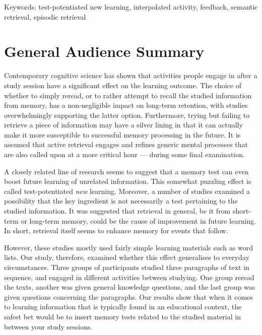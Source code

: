 \documentclass[12pt]{article}
\begin{document}
\bigskip

\noindent Keywords: test-potentiated new learning, interpolated activity, 
feedback, semantic retrieval, episodic retrieval

\clearpage

\section{General Audience Summary}

%
%

Contemporary cognitive science has shown that activities people engage in 
after a study session have a significant effect on the learning outcome. The 
choice of whether to simply reread, or to rather attempt to recall the 
studied information from memory, has a non-negligible impact on long-term 
retention, with studies overwhelmingly supporting the latter option. 
Furthermore, trying but failing to retrieve a piece of information may have 
a silver lining in that it can actually make it more susceptible to 
successful memory processing in the future. It is assumed that active 
retrieval engages and refines generic mental processes that are also called 
upon at a more critical hour --- during some final examination. 

A closely related line of research seems to suggest that a memory test can 
even boost future learning of unrelated information. This somewhat puzzling 
effect is called test-potentiated \textit{new} learning. Moreover, a number 
of studies examined a possibility that the key ingredient is not necessarily 
a test pertaining to the studied information. It was suggested that 
retrieval in general, be it from short-term or long-term memory, could be 
the cause of improvement in future learning. In short, retrieval itself 
seems to enhance memory for events that follow. 

However, these studies mostly used fairly simple learning materials such as 
word lists. Our study, therefore, examined whether this effect generalises 
to everyday circumstances. Three groups of participants studied three 
paragraphs of text in sequence, and engaged in different activities between 
studying. One group reread the texts, another was given general knowledge 
questions, and the last group was given questions concerning the paragraphs. 
Our results show that when it comes to learning information that is 
typically found in an educational context, the safest bet would be to insert 
memory tests related to the studied material in between your study sessions.
\end{document}
